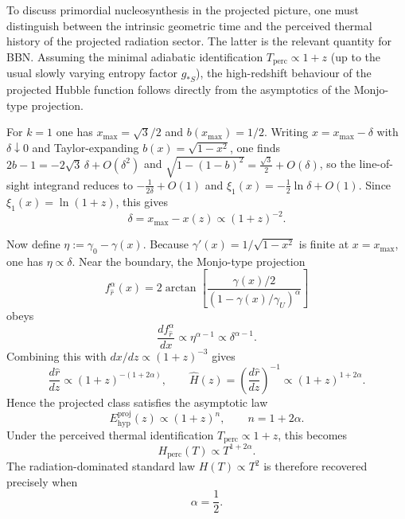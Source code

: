 \documentclass[3p,times,twocolumn]{elsarticle}
\begin{document}
To discuss primordial nucleosynthesis in the projected picture, one must distinguish between the intrinsic geometric time and the perceived thermal history of the projected radiation sector. The latter is the relevant quantity for BBN. Assuming the minimal adiabatic identification $T_{\mathrm{perc}}\propto 1+z$ (up to the usual slowly varying entropy factor $g_{*S}$), the high-redshift behaviour of the projected Hubble function follows directly from the asymptotics of the Monjo-type projection.

For $k=1$ one has $x_{\max}=\sqrt{3}/2$ and $b(x_{\max})=1/2$. Writing $x=x_{\max}-\delta$ with $\delta\downarrow0$ and Taylor-expanding $b(x)=\sqrt{1-x^2}$, one finds $2b-1=-2\sqrt{3}\,\delta+O(\delta^2)$ and $\sqrt{1-(1-b)^2}=\frac{\sqrt{3}}{2}+O(\delta)$, so the line-of-sight integrand reduces to $-\frac{1}{2\delta}+O(1)$ and $\xi_1(x)=-\frac{1}{2}\ln\delta+O(1)$. Since $\xi_1(x)=\ln(1+z)$, this gives
\begin{equation}
\delta=x_{\max}-x(z)\propto (1+z)^{-2}.
\end{equation}

Now define $\eta:=\gamma_0-\gamma(x)$. Because $\gamma'(x)=1/\sqrt{1-x^2}$ is finite at $x=x_{\max}$, one has $\eta\propto\delta$. Near the boundary, the Monjo-type projection
\begin{equation}
f_{\hat r}^{\alpha}(x)=2\arctan\!\left[\frac{\gamma(x)/2}{(1-\gamma(x)/\gamma_U)^\alpha}\right]
\end{equation}
obeys
\begin{equation}
\frac{df_{\hat r}^{\alpha}}{dx}\propto \eta^{\alpha-1}\propto \delta^{\alpha-1}.
\end{equation}
Combining this with $dx/dz\propto (1+z)^{-3}$ gives
\begin{equation}
\frac{d\hat r}{dz}\propto (1+z)^{-(1+2\alpha)},
\qquad
\hat H(z)=\left(\frac{d\hat r}{dz}\right)^{-1}\propto (1+z)^{1+2\alpha}.
\end{equation}
Hence the projected class satisfies the asymptotic law
\begin{equation}
E_{\mathrm{hyp}}^{\mathrm{proj}}(z)\propto (1+z)^n,
\qquad n=1+2\alpha.
\end{equation}
Under the perceived thermal identification $T_{\mathrm{perc}}\propto 1+z$, this becomes
\begin{equation}
H_{\mathrm{perc}}(T)\propto T^{1+2\alpha}.
\end{equation}
The radiation-dominated standard law $H(T)\propto T^2$ is therefore recovered precisely when
\begin{equation}
\alpha=\frac12.
\end{equation}
\end{document}
